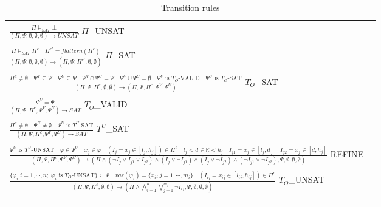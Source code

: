 \begin{table*}[t]
  \centering
  \begin{tabular}{ll}
  \hline\\
  \large 
  $\frac{\Pi \models_{SAT} \bot}{(\Pi, \Psi, \emptyset, \emptyset, \emptyset) \to UNSAT}$ \tiny $\Pi$\_UNSAT \\\\
  \large 
  $\frac{\Pi \models_{SAT} \Pi^c \quad \Pi^{c'} = flattern(\Pi^c)}{(\Pi, \Psi, \emptyset, \emptyset, \emptyset) \to (\Pi, \Psi, \Pi^{c'}, \emptyset, \emptyset)}$ \tiny $\Pi$\_SAT\\\\
  $\frac{\Pi^c \not= \emptyset \quad \Psi^V \subseteq \Psi \quad \Psi^U \subseteq \Psi \quad \Psi^V \cap \Psi^U = \Psi \quad \Psi^V \cup \Psi^U = \emptyset \quad \Psi^V \text{ is }  T_O\text{-VALID} \quad \Psi^U \text{ is }  T_O\text{-SAT}}{(\Pi, \Psi, \Pi^c, \emptyset, \emptyset) \to (\Pi, \Psi, \Pi^c, \Psi^V, \Psi^U)}$ \tiny $T_O$\_SAT \\\\  
  \large 
  $\frac{\Psi^V = \Psi}{(\Pi, \Psi, \Pi^c, \Psi^V, \Psi^U) \to SAT}$ \tiny $T_O$\_VALID \\\\
  \large 
  $\frac{\Pi^c \not= \emptyset \quad \Psi^U \not= \emptyset \quad \Psi^U \text{ is }  T^U\text{-SAT}}{(\Pi, \Psi, \Pi^c, \Psi^V, \Psi^U) \to SAT}$ \tiny $T^U$\_SAT \\\\
  \large 
  $\frac{\Psi^U \text{ is }  T^U\text{-UNSAT} \quad \varphi \in \Psi^U \quad x_j \in \varphi \quad (I_j = x_j \in [l_j, h_j]) \in \Pi^c \quad l_j < d \in \mathbb{R} < h_j \quad I_{j1} = x_j \in [l_j, d] \quad I_{j2} = x_j \in [d, h_j]}{(\Pi, \Psi, \Pi^c, \Psi^V, \Psi^U) \to (\Pi \wedge (\neg I_j \vee I_{j1} \vee I_{j2}) \wedge (I_j \vee \neg I_{j1}) \wedge (I_j \vee \neg I_{j2}) \wedge (\neg I_{j1} \vee \neg I_{j2}), \Psi, \emptyset, \emptyset, \emptyset)}$ \tiny REFINE \\\\
  \large 
  $\frac{\{\varphi_i| i = 1,\cdots, n; \; \varphi_i \text{ is } T_O\text{-UNSAT}\} \subseteq \Psi \quad var(\varphi_i) = \{x_{ij}|j=1,\cdots, m_i\} \quad (I_{ij} = x_{ij} \in [l_{ij}, h_{ij}]) \in \Pi^c}{(\Pi, \Psi, \Pi^c, \emptyset, \emptyset) \to (\Pi \wedge \bigwedge\limits_{i=1}^n \bigvee\limits_{j=1}^{m_i} \neg I_{ij}, \Psi, \emptyset, \emptyset, \emptyset)}$ \tiny $T_O$\_UNSAT \\\\
  \hline\\
  \end{tabular}
  \caption{Transition rules}\label{tab:transition-rules}
\end{table*}

